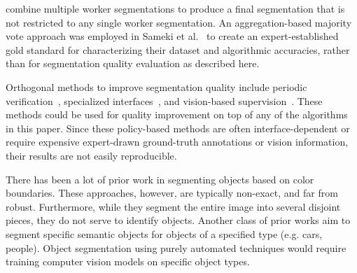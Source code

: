  combine multiple worker segmentations to produce a final segmentation that is not restricted to any single worker segmentation. An aggregation-based majority vote approach was employed in Sameki et al.~\cite{Sameki2015} to create an expert-established gold standard for characterizing their dataset and algorithmic accuracies, rather than for segmentation quality evaluation as described here.

\par Orthogonal methods to improve segmentation quality include periodic verification~\cite{Lin2014,Everingham15}, specialized interfaces~\cite{Song2018}, and vision-based supervision~\cite{Russakovsky2015,Gurari2016}. These methods could be used for quality improvement on top of any of the algorithms in this paper.  Since these policy-based methods are often interface-dependent or require expensive expert-drawn ground-truth annotations or vision information, their results are not easily reproducible. %

 There has been a lot of prior work in segmenting objects based on color boundaries\cite{felzenszwalb2004efficient,Y.Y.Boykov2001}. These approaches, however, are typically non-exact, and far from robust. Furthermore, while they segment the entire image into several disjoint pieces, they do not serve to identify objects. Another class of prior works aim to segment specific semantic objects for objects of a specified type (e.g. cars, people)\cite{AdrianaKovashka2016,Lin2014,zhou2017scene}. Object segmentation using purely automated techniques would require training computer vision models on specific object types. 